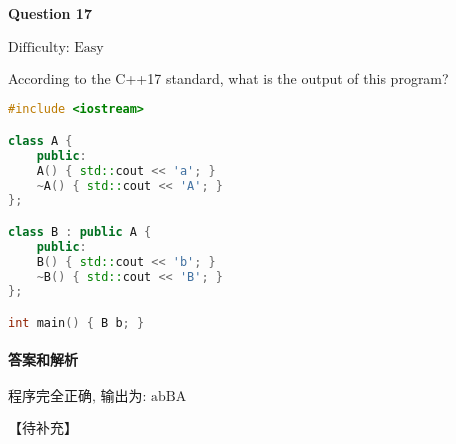 \documentclass{article}
\begin{document}
	\paragraph*{Question 17} $\boxed{\text{Difficulty: Easy}} $			
	
	According to the C++17 standard, what is the output of this program?
	
	\begin{lstlisting}[language=C++]  		
#include <iostream>

class A {
	public:
	A() { std::cout << 'a'; }
	~A() { std::cout << 'A'; }
};

class B : public A {
	public:
	B() { std::cout << 'b'; }
	~B() { std::cout << 'B'; }
};

int main() { B b; }
	\end{lstlisting}
	
	
	\paragraph*{答案和解析} $\boxed{\text{程序完全正确, 输出为: abBA}} $
	
	【待补充】
\end{document}
